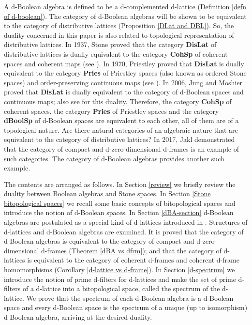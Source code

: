 \documentclass[11pt]{article}
\theoremstyle{plain}
\theoremstyle{definition}
\begin{document}
A d-Boolean algebra is defined to be a d-complemented d-lattice (Definition \ref{defn of d-boolean}). The category of d-Boolean algebras will be shown to be equivalent to the category of distributive lattices (Proposition \ref{DLat and DBL}). So, the duality concerned in this paper is also related to topological representation of  distributive lattices. In 1937, Stone \cite{Stone37b} proved that the category {\bf DisLat} of distributive lattices is dually equivalent to the category {\bf CohSp} of coherent spaces and coherent maps (see \cite[page 66]{Johnstone}). In 1970, Priestley \cite{Priestley70,Priestley72} proved that {\bf DisLat} is dually equivalent to the category {\bf Pries} of Priestley spaces  (also known as ordered Stone spaces) and order-preserving continuous maps (see \cite[page 75]{Johnstone}). In 2006, Jung and Moshier \cite[Corollary 8.13]{JM2006} proved that  {\bf DisLat} is dually equivalent to the category of d-Boolean spaces and continuous maps; also see \cite[Theorem 5.3]{BBGK} for this duality. 
Therefore, the category {\bf CohSp} of coherent spaces, the category {\bf Pries} of Priestley spaces and the category {\bf dBoolSp} of d-Boolean spaces are equivalent to each other, all of them are of a topological nature. Are there natural categories of an algebraic nature that are equivalent to the category of distributive lattices? In 2017, Jakl \cite[Section 2.6]{Jakl} demonstrated that the category of compact and d-zero-dimensional d-frames is an example of such categories. The category of d-Boolean algebras provides another such example. 

The contents are arranged as follows. In Section \ref{review}  we briefly review  the duality between Boolean algebras and Stone spaces. In Section \ref{Stone bitopological spaces} we recall  some basic concepts of bitopological spaces and introduce  the notion of d-Boolean spaces. In Section \ref{dBA-section} d-Boolean algebras are postulated as a special kind of d-lattices introduced in \cite{Klinke,KJM}. Structures of d-lattices and d-Boolean algebras are examined. It is proved that the category of d-Boolean algebras is equivalent to the category of compact and d-zero-dimensional d-frames (Theorem  \ref{dBA vs dfrm}); and that the category of d-lattices is equivalent to the category of  coherent d-frames and coherent d-frame homomorphisms (Corollary \ref{d-lattice vs d-frame}). In Section \ref{d-spectrum} we introduce  the notion of prime d-filters for d-lattices and make  the set of prime d-filters of a d-lattice  into a bitopological space, called the spectrum of the d-lattice. We prove  that the spectrum of each d-Boolean algebra is a d-Boolean space and every d-Boolean space is the spectrum of a unique (up to isomorphism) d-Boolean algebra, arriving at the desired duality.  
  
\end{document}
